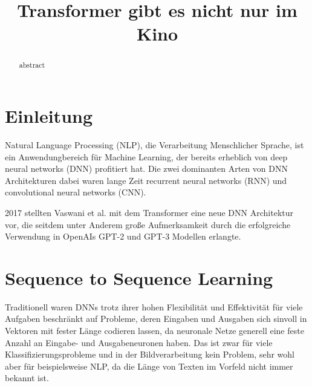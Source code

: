 \documentclass[conference]{IEEEtran}
\begin{document}
\title{Transformer gibt es nicht nur im Kino}


\author{
}

\maketitle


\begin{abstract}
abstract
\end{abstract}


\section{Einleitung}
Natural Language Processing (NLP), die Verarbeitung Menschlicher Sprache, ist ein Anwendungbereich für Machine Learning, der bereits erheblich von deep neural networks (DNN) profitiert hat. Die zwei dominanten Arten von DNN Architekturen dabei waren lange Zeit recurrent neural networks (RNN) und convolutional neural networks (CNN). \cite{comparative_study_cnn_rnn}

2017 stellten Vaswani et al. \cite{attention_is_all_you_need} mit dem Transformer eine neue DNN Architektur vor, die seitdem unter Anderem große Aufmerksamkeit durch die erfolgreiche Verwendung in OpenAIs GPT-2 und GPT-3 Modellen erlangte.

\section{Sequence to Sequence Learning}
Traditionell waren DNNs trotz ihrer hohen Flexibilität und Effektivität für viele Aufgaben beschränkt auf Probleme, deren Eingaben und Ausgaben sich sinvoll in Vektoren mit fester Länge codieren lassen, da neuronale Netze generell eine feste Anzahl an Eingabe- und Ausgabeneuronen haben. Das ist zwar für viele Klassifizierungsprobleme und in der Bildverarbeitung kein Problem, sehr wohl aber für beispielsweise NLP, da die Länge von Texten im Vorfeld nicht immer bekannt ist. \cite{sequence_to_sequence}
\end{document}
